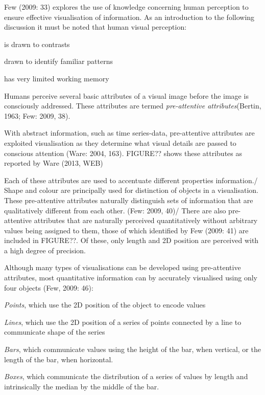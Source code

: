 \documentclass[a4paper,12pt]{article}
\begin{document}
 Few (2009: 33) explores the use of knowledge concerning human perception to ensure effective visualisation of information.
 As an introduction to the following discussion it must be noted that human visual perception:
 \begin{itemize}[label=-]
   \item{is drawn to contrasts}
   \item{drawn to identify familiar patterns}
   \item{has very limited working memory}
     
     Humans perceive several basic attributes of a visual image before the image is consciously addressed. These attributes are termed
     \emph{pre-attentive attributes}(Bertin, 1963; Few: 2009, 38).

     With abstract information, such as time series-data, pre-attentive attributes are exploited visualisation as they determine what
     visual details are passed to conscious attention (Ware: 2004, 163). FIGURE?? shows these attributes as reported by Ware (2013, WEB)

     Each of these attributes are used to accentuate different properties information./
     Shape and colour are principally used for distinction of objects in a visualisation. These pre-attentive attributes naturally
     distinguish sets of information that are qualitatively different from each other. (Few: 2009, 40)/ %
     There are also pre-attentive attributes that are naturally perceived quantitatively without arbitrary values being assigned to them, those
     of which identified by Few (2009: 41) are included in FIGURE??. Of these, only length and 2D position are perceived with a high degree of precision.

     Although many types of visualisations can be developed using pre-attentive attributes, most quantitative information can by accurately visualised using only four objects (Few, 2009: 46):
     	\item{\emph{Points}, which use the 2D position of the object to encode values
	\item{\emph{Lines}, which use the 2D position of a series of points connected by a line to communicate shape of the series
	\item{\emph{Bars}, which communicate values using the height of the bar, when vertical, or the length of the bar, when horizontal.
	\item{\emph{Boxes}, which communicate the distribution of a series of values by length and intrinsically the median by the middle of the bar.
	
}}}}
\end{itemize}
\end{document}
